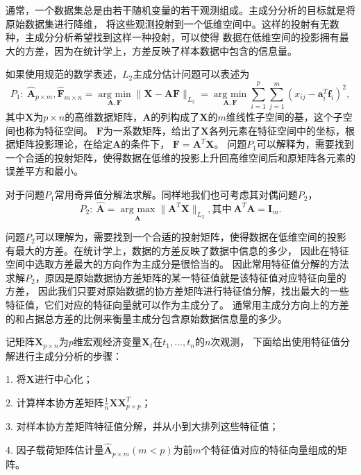 通常，一个数据集总是由若干随机变量的若干观测组成。主成分分析的目标就是将原始数据集进行降维，
将这些观测投射到一个低维空间中。这样的投射有无数种，主成分分析希望找到这样一种投射，可以使得
数据在低维空间的投影拥有最大的方差，因为在统计学上，方差反映了样本数据中包含的信息量。

如果使用规范的数学表述，$L_2$主成分估计问题可以表述为
\begin{equation}\label{pca-l2-p1}
P_1: \ \hat{\bm{A}}_{p\times m}, \hat{\bm{F}}_{m\times n} = \underset{\bm{A},\bm{F}}{\operatorname{arg\ min} } 
\|\bm{X} - \bm{A}\bm{F}\|_{L_2}
 = \underset{\bm{A}, \bm{F}}{\operatorname{arg\ min}} \sum_{i=1}^p \sum_{j=1}^m (x_{ij} - \bm a_i^T\bm f_i)^2 ,
\end{equation}
其中$\bm{X}$为$p \times n$的高维数据矩阵，$\bm{A}$的列构成了$\bm{X}$的$m$维线性子空间的基，这个子空间也称为特征空间。
$\bm{F}$为一系数矩阵，给出了$\bm{X}$各列元素在特征空间中的坐标，根据矩阵投影理论，在给定$\bm{A}$的条件下，
$\bm{F} = \bm{A}^T \bm{X}$。
问题$P_1$可以解释为，需要找到一个合适的投射矩阵，使得数据在低维的投影上升回高维空间后和原矩阵各元素的误差平方和最小。

对于问题$P_1$常用奇异值分解法求解\cite{kalman1996singularly}。同样地我们也可考虑其对偶问题$P_2$，
\begin{equation}\label{pca-l2-p2}
P_2: \ \hat{\bm{A}} = \underset{\bm{A}}{\operatorname{arg\ max}} \| \bm{A}^T \bm{X}\|_{L_2}, \text{其中}\ \bm{A}^T
\bm{A} = \bm{I}_m.
\end{equation}

问题$P_2$可以理解为，需要找到一个合适的投射矩阵，使得数据在低维空间的投影有最大的方差。在统计学上，数据的方差反映了数据中信息的多少，
因此在特征空间中选取方差最大的方向作为主成分是很恰当的。
因此常用特征值分解的方法求解$P_2$，原因是原始数据协方差矩阵的某一特征值就是该特征值对应特征向量的方差，
因此我们只要对原始数据的协方差矩阵进行特征值分解，找出最大的一些特征值，它们对应的特征向量就可以作为主成分了。
通常用主成分方向上的方差的和占据总方差的比例来衡量主成分包含原始数据信息量的多少。

记矩阵$\bm{X}_{p\times n}$为$p$维宏观经济变量$\bm{X}_t$在$t_1, ..., t_n$的$n$次观测，
下面给出使用特征值分解进行主成分分析的步骤：

1. 将$\bm{X}$进行中心化；

2. 计算样本协方差矩阵$\frac1{n}\bm{X}\bm{X}^T_{p\times p}$；

3. 对样本协方差矩阵特征值分解，并从小到大排列这些特征值；

4. 因子载荷矩阵估计量$\hat{\bm{A}}_{p\times m} (m < p)$为前$m$个特征值对应的特征向量组成的矩阵。

